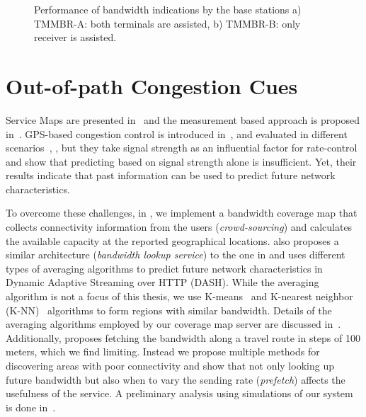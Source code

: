 \begin{figure}
  \centerline{
  }
  \caption{Performance of bandwidth indications by the base stations a)
  TMMBR-A: both terminals are assisted, b) TMMBR-B: only receiver is
  assisted.}
  \label{fig:tmmbn}
\end{figure}


\section{Out-of-path Congestion Cues}


Service Maps are presented in~\cite{1630563} and the measurement based
approach is proposed in~\cite{Aravinda:2008p14}. GPS-based congestion control
is introduced in~\cite{Yao:2008p21}, and evaluated in different
scenarios~\cite{Yao:2009p57}, \cite{Yao:2010p64}, but they take signal
strength as an influential factor for rate-control and show that predicting
based on signal strength alone is insufficient. Yet, their results indicate
that past information can be used to predict future network characteristics.

To overcome these challenges, in , we implement a bandwidth
coverage map that collects connectivity information from the users
(\emph{crowd-sourcing}) and calculates the available capacity at the reported
geographical locations. \cite{6012045} also proposes a similar architecture
(\emph{bandwidth lookup service}) to the one in  and uses
different types of averaging algorithms to predict future network
characteristics in Dynamic Adaptive Streaming over HTTP (DASH). While the
averaging algorithm is not a focus of this thesis, we use
K-means~\cite{Kanungo:2002:LSA:513400.513402} and K-nearest neighbor
(K-NN)~\cite{Iwerks:2003:CKN:1315451.1315496} algorithms to form regions with
similar bandwidth. Details of the averaging algorithms employed by our
coverage map server are discussed in~\cite{sharmistha-thesis}. Additionally,
\cite{Riiser:2012:2240136} proposes fetching the bandwidth along a travel
route in steps of 100 meters, which we find limiting. Instead we propose
multiple methods for discovering areas with poor connectivity and show that
not only looking up future bandwidth but also when to vary the sending rate
(\emph{prefetch}) affects the usefulness of the service. A preliminary
analysis using simulations of our system is done in~\cite{Curcio:glass}.

